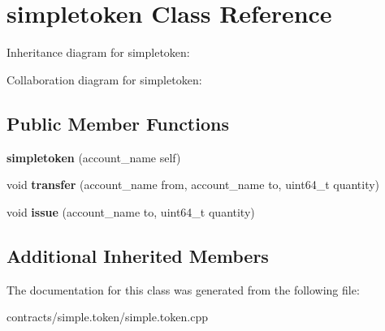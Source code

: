 \hypertarget{classsimpletoken}{}\section{simpletoken Class Reference}
\label{classsimpletoken}


Inheritance diagram for simpletoken\+:


Collaboration diagram for simpletoken\+:
\subsection*{Public Member Functions}
\begin{DoxyCompactItemize}
\item 
\mbox{\label{classsimpletoken_a23831a91fc400e48320a4e5ce50a12fb}} 
{\bfseries simpletoken} (account\+\_\+name self)
\item 
\mbox{\label{classsimpletoken_addf9ed66f35fe11639fcec8169c4d1d8}} 
void {\bfseries transfer} (account\+\_\+name from, account\+\_\+name to, uint64\+\_\+t quantity)
\item 
\mbox{\label{classsimpletoken_a46f5bf5e50cf4e324a280981bea28d1f}} 
void {\bfseries issue} (account\+\_\+name to, uint64\+\_\+t quantity)
\end{DoxyCompactItemize}
\subsection*{Additional Inherited Members}


The documentation for this class was generated from the following file\+:\begin{DoxyCompactItemize}
\item 
contracts/simple.\+token/simple.\+token.\+cpp\end{DoxyCompactItemize}
